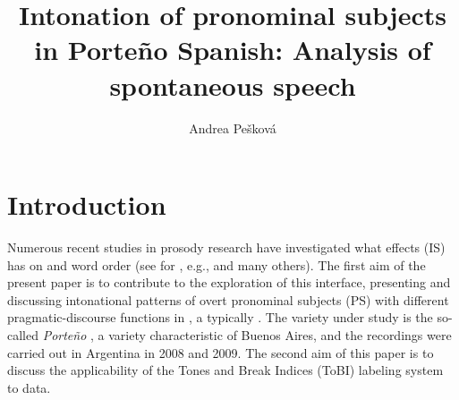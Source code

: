 \documentclass[output=paper]{langsci/langscibook}
\author{Andrea Pešková\affiliation{Universität Osnabrück}}
\title{Intonation of pronominal subjects in Porte{\~n}o Spanish: Analysis of spontaneous speech}
\subtitle{}
\begin{document}
 \label{chap:pes}\label{ch:2}




\section{Introduction}
\label{sec:pes:1}
Numerous recent studies in prosody research have investigated what effects  (IS) has on  and word order (see for , e.g., \citealt{Face2001,Gabriel2010article,Vanrell.unpublished,Uth2014} and many others). The first aim of the present paper is to contribute to the exploration of this interface, presenting and discussing intonational patterns of overt pronominal subjects (PS) with different pragmatic-discourse functions in , a typically . The variety under study is the so-called \textit{Porte{\~n}o} , a variety characteristic of Buenos Aires, and the recordings were carried out in Argentina in 2008 and 2009. The second aim of this paper is to discuss the applicability of the  Tones and Break Indices (ToBI) labeling system to  data.
\end{document}
